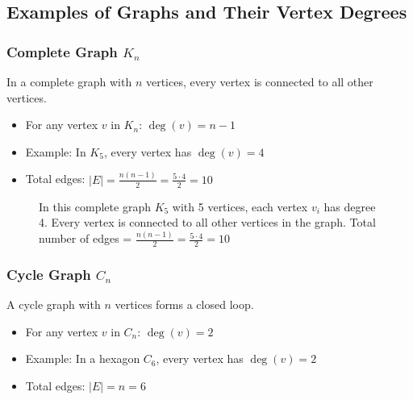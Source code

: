 \documentclass{article}
\theoremstyle{definition}
\begin{document}
\subsection{Examples of Graphs and Their Vertex Degrees}

\subsubsection{Complete Graph $K_n$}
In a complete graph with $n$ vertices, every vertex is connected to all other vertices.
\begin{itemize}
    \item For any vertex $v$ in $K_n$: $\deg(v) = n-1$
    \item Example: In $K_5$, every vertex has $\deg(v) = 4$
    \item Total edges: $|E| = \frac{n(n-1)}{2} = \frac{5 \cdot 4}{2} = 10$
\end{itemize}

\begin{figure}[H]
\centering
{}
\caption{In this complete graph $K_5$ with 5 vertices, each vertex $v_i$ has degree 4. Every vertex is connected to all other vertices in the graph. Total number of edges = $\frac{n(n-1)}{2} = \frac{5 \cdot 4}{2} = 10$}
\end{figure}

\subsubsection{Cycle Graph $C_n$}
A cycle graph with $n$ vertices forms a closed loop.
\begin{itemize}
    \item For any vertex $v$ in $C_n$: $\deg(v) = 2$
    \item Example: In a hexagon $C_6$, every vertex has $\deg(v) = 2$
    \item Total edges: $|E| = n = 6$
\end{itemize}
\end{document}
